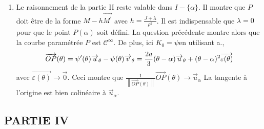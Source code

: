 \begin{enumerate}
\begin{enumerate}
\item  Le raisonnement de la partie II reste valable dans $I-\{\alpha \}.$
Il montre que $P$ doit \^{e}tre de la forme $M-h\overrightarrow{M^{\prime }}$
avec $h=\frac{J+\lambda }{\rho ^{2}}$. Il est indispensable que $\lambda =0$
pour que le point $P(\alpha )$ soit d\'{e}fini. La question
pr\'{e}c\'{e}dente montre alors que la courbe param\'{e}tr\'{e}e $P$ est $%
\mathcal{C}^{\infty }$. De plus, ici $K_{0}=\psi $en utilisant a., 
\[
\overrightarrow{OP}(\theta )=\psi ^{\prime }(\theta )\overrightarrow{u}%
_{\theta }-\psi (\theta )\overrightarrow{v}_{\theta }=\frac{2a}{3}(\theta
-\alpha )\overrightarrow{u}_{\theta }+(\theta -\alpha )^{2}\overrightarrow{%
\varepsilon (\theta )} 
\]
avec $\overrightarrow{\varepsilon (\theta )}\rightarrow \overrightarrow{0}$.
Ceci montre que $\frac{1}{\left\| \overrightarrow{OP}(\theta )\right\| }%
\overrightarrow{OP}(\theta )\rightarrow \overrightarrow{u}_{\alpha }$ La
tangente \`{a} l'origine est bien colin\'{e}aire \`{a} $\overrightarrow{u}%
_{\alpha }$.
\end{enumerate}
\end{enumerate}

\subsection*{PARTIE IV}

